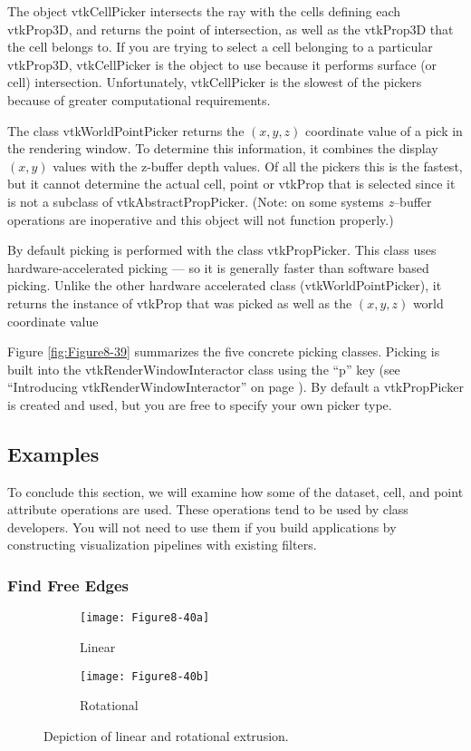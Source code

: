 The object vtkCellPicker intersects the ray with the cells defining each vtkProp3D, and returns the point of intersection, as well as the vtkProp3D that the cell belongs to. If you are trying to select a cell belonging to a particular vtkProp3D, vtkCellPicker is the object to use because it performs surface (or cell) intersection. Unfortunately, vtkCellPicker is the slowest of the pickers because of greater computational requirements.

The class vtkWorldPointPicker returns the $(x,y,z)$ coordinate value of a pick in the rendering window. To determine this information, it combines the display $(x,y)$ values with the z-buffer depth values. Of all the pickers this is the fastest, but it cannot determine the actual cell, point or vtkProp that is selected since it is not a subclass of vtkAbstractPropPicker. (Note: on some systems \emph{z}--buffer operations are inoperative and this object will not function properly.)

By default picking is performed with the class vtkPropPicker. This class uses hardware-accelerated picking --- so it is generally faster than software based picking. Unlike the other hardware accelerated class (vtkWorldPointPicker), it returns the instance of vtkProp that was picked as well as the $(x,y,z)$ world coordinate value

Figure \ref{fig:Figure8-39} summarizes the five concrete picking classes. Picking is built into the vtkRenderWindowInteractor class using the ``p'' key (see ``Introducing vtkRenderWindowInteractor'' on page \pageref{subsec:introducing_vtkRenderWindowInteractor}). By default a vtkPropPicker is created and used, but you are free to specify your own picker type.

\subsection{Examples}

To conclude this section, we will examine how some of the dataset, cell, and point attribute operations are used. These operations tend to be used by class developers. You will not need to use them if you build applications by constructing visualization pipelines with existing filters.

\subsubsection{Find Free Edges}

\begin{figure}[!htb]
    \centering
    \begin{subfigure}{0.48\linewidth}
        \centering
        \texttt{[image: Figure8-40a]}
        \caption{Linear}\label{fig:Figure8-40a}
    \end{subfigure}
    \hfill
    \begin{subfigure}{0.48\linewidth}
        \centering
        \texttt{[image: Figure8-40b]}
        \caption{Rotational}\label{fig:Figure8-40b}
    \end{subfigure}%
    \caption{Depiction of linear and rotational extrusion.}
    \label{fig:Figure8-40}
\end{figure}

